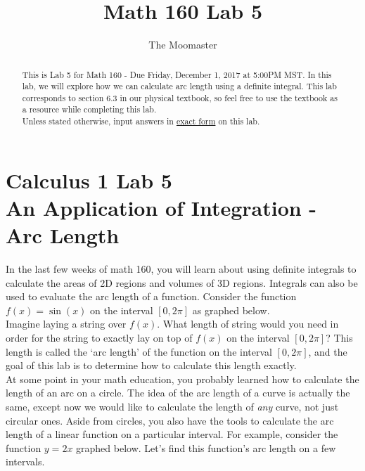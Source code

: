 \documentclass[handout,nooutcomes]{ximera}
\title{Math 160 Lab 5}
\author{The Moomaster}
\begin{document}
\section{Calculus 1 Lab 5 \\ An Application of Integration - Arc Length}

\begin{abstract}
This is Lab 5 for Math 160 - Due Friday, December 1, 2017 at 5:00PM MST.  In this lab, we will explore how we can calculate arc length using a definite integral.  This lab corresponds to section 6.3 in our physical textbook, so feel free to use the textbook as a resource while completing this lab.\\

Unless stated otherwise, input answers in \underline{exact form} on this lab.
\end{abstract}

\maketitle


In the last few weeks of math 160, you will learn about using definite integrals to calculate the areas of 2D regions and volumes of 3D regions.  Integrals can also be used to evaluate the arc length of a function.  Consider the function $f(x) = \sin(x)$ on the interval $[0,2\pi]$ as graphed below.  \\


Imagine laying a string over $f(x)$.  What length of string would you need in order for the string to exactly lay on top of $f(x)$ on the interval $[0, 2\pi]$?  This length is called the `arc length' of the function on the interval $[0, 2\pi]$, and the goal of this lab is to determine how to calculate this length exactly.  \\

At some point in your math education, you probably learned how to calculate the length of an arc on a circle.  The idea of the arc length of a curve is actually the same, except now we would like to calculate the length of \textit{any} curve, not just circular ones.  Aside from circles, you also have the tools to calculate the arc length of a linear function on a particular interval.  For example, consider the function $y = 2x$ graphed below.  Let's find this function's arc length on a few intervals.
\end{document}
